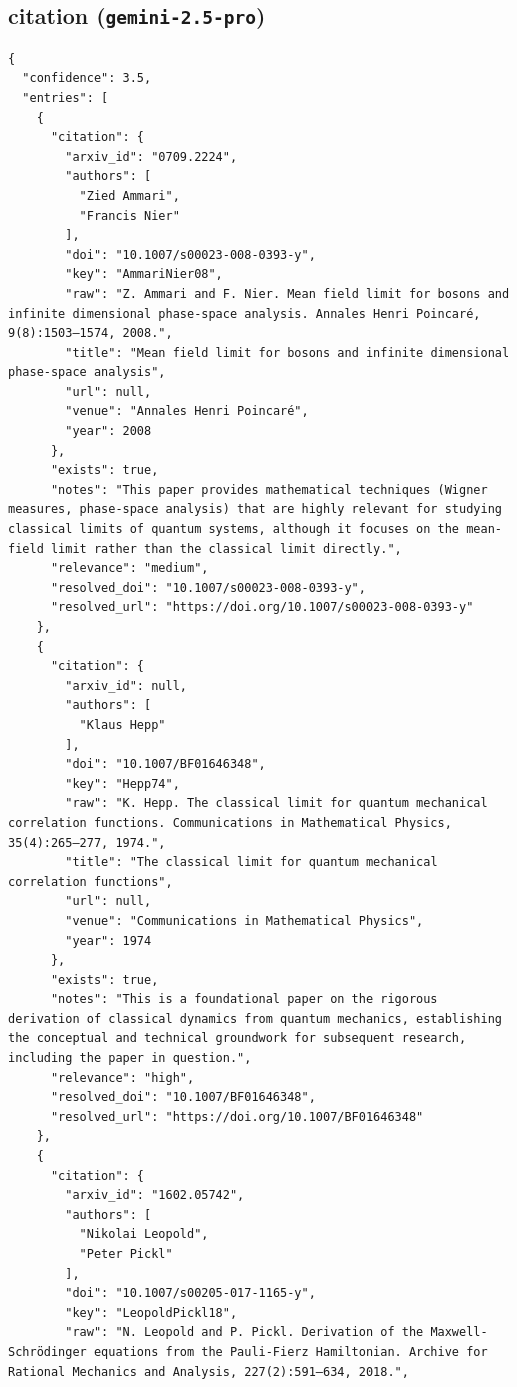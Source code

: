 \documentclass[11pt]{article}
\begin{document}
\subsection*{citation (\texttt{gemini-2.5-pro})}
\begin{verbatim}
{
  "confidence": 3.5,
  "entries": [
    {
      "citation": {
        "arxiv_id": "0709.2224",
        "authors": [
          "Zied Ammari",
          "Francis Nier"
        ],
        "doi": "10.1007/s00023-008-0393-y",
        "key": "AmmariNier08",
        "raw": "Z. Ammari and F. Nier. Mean field limit for bosons and infinite dimensional phase-space analysis. Annales Henri Poincaré, 9(8):1503–1574, 2008.",
        "title": "Mean field limit for bosons and infinite dimensional phase-space analysis",
        "url": null,
        "venue": "Annales Henri Poincaré",
        "year": 2008
      },
      "exists": true,
      "notes": "This paper provides mathematical techniques (Wigner measures, phase-space analysis) that are highly relevant for studying classical limits of quantum systems, although it focuses on the mean-field limit rather than the classical limit directly.",
      "relevance": "medium",
      "resolved_doi": "10.1007/s00023-008-0393-y",
      "resolved_url": "https://doi.org/10.1007/s00023-008-0393-y"
    },
    {
      "citation": {
        "arxiv_id": null,
        "authors": [
          "Klaus Hepp"
        ],
        "doi": "10.1007/BF01646348",
        "key": "Hepp74",
        "raw": "K. Hepp. The classical limit for quantum mechanical correlation functions. Communications in Mathematical Physics, 35(4):265–277, 1974.",
        "title": "The classical limit for quantum mechanical correlation functions",
        "url": null,
        "venue": "Communications in Mathematical Physics",
        "year": 1974
      },
      "exists": true,
      "notes": "This is a foundational paper on the rigorous derivation of classical dynamics from quantum mechanics, establishing the conceptual and technical groundwork for subsequent research, including the paper in question.",
      "relevance": "high",
      "resolved_doi": "10.1007/BF01646348",
      "resolved_url": "https://doi.org/10.1007/BF01646348"
    },
    {
      "citation": {
        "arxiv_id": "1602.05742",
        "authors": [
          "Nikolai Leopold",
          "Peter Pickl"
        ],
        "doi": "10.1007/s00205-017-1165-y",
        "key": "LeopoldPickl18",
        "raw": "N. Leopold and P. Pickl. Derivation of the Maxwell-Schrödinger equations from the Pauli-Fierz Hamiltonian. Archive for Rational Mechanics and Analysis, 227(2):591–634, 2018.",

\end{verbatim}
\end{document}
